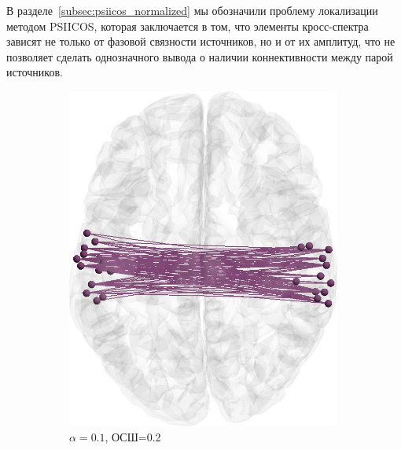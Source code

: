 В разделе~\ref{subsec:psiicos_normalized} мы обозначили проблему локализации методом PSIICOS,
которая заключается в том, что элементы кросс-спектра зависят не только от фазовой связности
источников, но и от их амплитуд, что не позволяет сделать однозначного вывода о наличии коннективности между парой источников.


\begin{figure}[htbp]
    \begin{subfigure}[t]{0.24\textwidth}
        \includegraphics[width=0.99\textwidth]{../images/loreta_brain_jitter_01_snr_02_phase_lag_07854.jpg}
        \caption{$\alpha=0.1$, ОСШ=0.2}\label{fig:unbiased_1_ntw_a}
    \end{subfigure}
    \begin{subfigure}[t]{0.24\textwidth}

\end{subfigure}
\end{figure}
